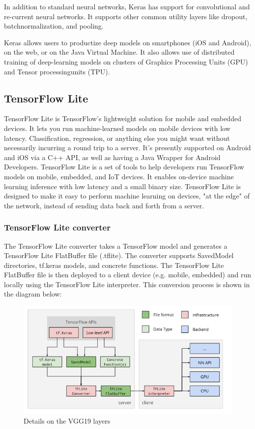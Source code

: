 In addition to standard neural networks, Keras has support for convolutional and re-current  neural  networks.   It  supports  other  common  utility  layers  like  dropout,  batchnormalization, and pooling.

Keras allows users to productize deep models on smartphones (iOS and Android), on the web, or on the Java Virtual Machine. It also allows use of distributed training of deep-learning models on clusters of Graphics Processing Units (GPU) and Tensor processingunits (TPU).

\subsection{TensorFlow Lite}
TensorFlow Lite is TensorFlow’s lightweight solution for mobile and embedded devices. It lets you run machine-learned models on mobile devices with low latency. Classification, regression, or anything else you might want without necessarily incurring a round trip to a server. It’s presently supported on Android and iOS via a C++ API, as well as having a Java Wrapper for Android Developers. TensorFlow Lite is a set of tools to help developers run TensorFlow models on mobile, embedded, and IoT devices. It enables on-device machine learning inference with low latency and a small binary size. TensorFlow Lite is designed to make it easy to perform machine learning on devices, "at the edge" of the network, instead of sending data back and forth from a server.
\subsubsection{TensorFlow Lite converter}
The TensorFlow Lite converter takes a TensorFlow model and generates a TensorFlow Lite FlatBuffer file (.tflite). The converter supports SavedModel directories, tf.keras models, and concrete functions. The TensorFlow Lite FlatBuffer file is then deployed to a client device (e.g. mobile, embedded) and run locally using the TensorFlow Lite interpreter. This conversion process is shown in the diagram below:

\begin{figure}[H]
	\label{ss}
	\centering
	\includegraphics[width=15cm,keepaspectratio]{tflite-converter-workflow.png}
	\caption{Details on the VGG19 layers}
\end{figure}

